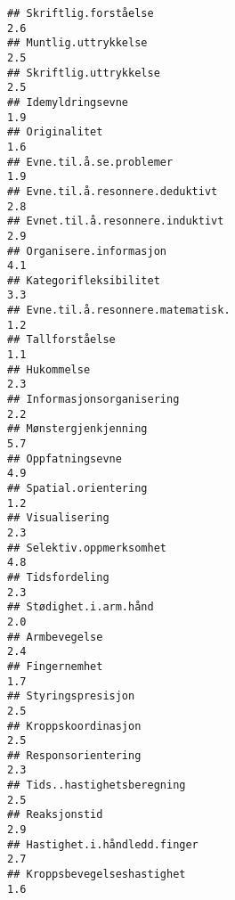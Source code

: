 \documentclass[
]{article}
\begin{document}
\begin{verbatim}
## Skriftlig.forståelse                                                             2.6
## Muntlig.uttrykkelse                                                              2.5
## Skriftlig.uttrykkelse                                                            2.5
## Idemyldringsevne                                                                 1.9
## Originalitet                                                                     1.6
## Evne.til.å.se.problemer                                                          1.9
## Evne.til.å.resonnere.deduktivt                                                   2.8
## Evnet.til.å.resonnere.induktivt                                                  2.9
## Organisere.informasjon                                                           4.1
## Kategorifleksibilitet                                                            3.3
## Evne.til.å.resonnere.matematisk.                                                 1.2
## Tallforståelse                                                                   1.1
## Hukommelse                                                                       2.3
## Informasjonsorganisering                                                         2.2
## Mønstergjenkjenning                                                              5.7
## Oppfatningsevne                                                                  4.9
## Spatial.orientering                                                              1.2
## Visualisering                                                                    2.3
## Selektiv.oppmerksomhet                                                           4.8
## Tidsfordeling                                                                    2.3
## Stødighet.i.arm.hånd                                                             2.0
## Armbevegelse                                                                     2.4
## Fingernemhet                                                                     1.7
## Styringspresisjon                                                                2.5
## Kroppskoordinasjon                                                               2.5
## Responsorientering                                                               2.3
## Tids..hastighetsberegning                                                        2.5
## Reaksjonstid                                                                     2.9
## Hastighet.i.håndledd.finger                                                      2.7
## Kroppsbevegelseshastighet                                                        1.6

\end{verbatim}
\end{document}
